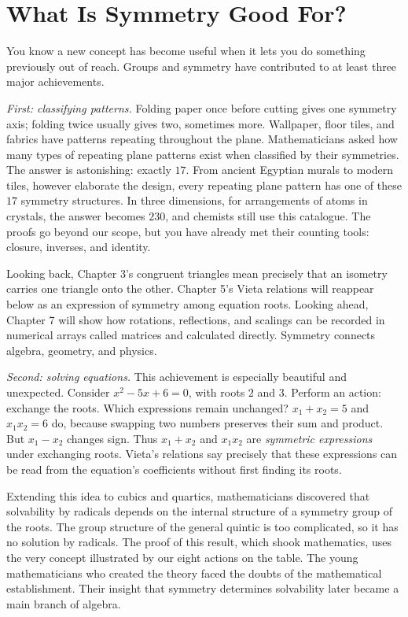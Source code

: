 \section{What Is Symmetry Good For?}

You know a new concept has become useful when it lets you do something previously out of reach. Groups and symmetry have contributed to at least three major achievements.

\emph{First: classifying patterns.} Folding paper once before cutting gives one symmetry axis; folding twice usually gives two, sometimes more. Wallpaper, floor tiles, and fabrics have patterns repeating throughout the plane. Mathematicians asked how many types of repeating plane patterns exist when classified by their symmetries. The answer is astonishing: exactly $17$. From ancient Egyptian murals to modern tiles, however elaborate the design, every repeating plane pattern has one of these $17$ symmetry structures. In three dimensions, for arrangements of atoms in crystals, the answer becomes $230$, and chemists still use this catalogue. The proofs go beyond our scope, but you have already met their counting tools: closure, inverses, and identity.

\begin{lianjie}
Looking back, Chapter 3's congruent triangles mean precisely that an isometry carries one triangle onto the other. Chapter 5's Vieta relations will reappear below as an expression of symmetry among equation roots. Looking ahead, Chapter 7 will show how rotations, reflections, and scalings can be recorded in numerical arrays called matrices and calculated directly. Symmetry connects algebra, geometry, and physics.
\end{lianjie}

\emph{Second: solving equations.} This achievement is especially beautiful and unexpected. Consider $x^2-5x+6=0$, with roots $2$ and $3$. Perform an action: exchange the roots. Which expressions remain unchanged? $x_1+x_2=5$ and $x_1x_2=6$ do, because swapping two numbers preserves their sum and product. But $x_1-x_2$ changes sign. Thus $x_1+x_2$ and $x_1x_2$ are \emph{symmetric expressions} under exchanging roots. Vieta's relations say precisely that these expressions can be read from the equation's coefficients without first finding its roots.

Extending this idea to cubics and quartics, mathematicians discovered that solvability by radicals depends on the internal structure of a symmetry group of the roots. The group structure of the general quintic is too complicated, so it has no solution by radicals. The proof of this result, which shook mathematics, uses the very concept illustrated by our eight actions on the table. The young mathematicians who created the theory faced the doubts of the mathematical establishment. Their insight that symmetry determines solvability later became a main branch of algebra.

